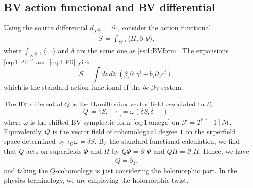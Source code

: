 \documentclass[final,reqno]{amsart}
\numberwithin{equation}{section}
\theoremstyle{definition}
\newcommand{\ol}{\overline}
\newcommand{\ceq}{\coloneqq} %
\newcommand{\clF}{\mathcal{F}}
\newcommand{\clM}{\mathcal{M}}
\newcommand{\pd}{\partial}
\newcommand{\sSig}{\Sigma^{1|1}}
\newcommand{\pair}[1]{\langle #1 \rangle}
\begin{document}
\subsection{BV action functional and BV differential}\label{ss:2.5}

Using the source differential $d_{\sSig}=\pd_{\ol{z}}$, 
consider the action functional
\begin{align}\label{eq:2:S}
 S \ceq \int_{\sSig} \pair{ \Pi, \pd_{\ol{z}} \Phi },
\end{align}
where $\int_{\sSig} $, $\pair{\cdot,\cdot}$ and $\delta$ 
are the same one as \cref{ss:1:BVform}.
The expansions \eqref{eq:1:Phii} and \eqref{eq:1:Pii} yield
\[
 S = \int dz\,d\ol{z}\;(\beta_i \pd_{\ol{z}}\gamma^i + b_i \pd_{\ol{z}}c^i),
\]
which is the standard action functional of the $bc$-$\beta\gamma$ system.

The BV differential $Q$ is the Hamiltonian vector field associated to $S$, 
\[
 Q \ceq \{S,-\}_\omega = \omega(\delta S,\delta-),
\]
where $\omega$ is the shifted BV symplectic form \eqref{eq:1:omega} 
on $\clF=T^*[-1]\clM$. 
Equivalently, $Q$ is the vector field of cohomological degree $1$ 
on the superfield space determined by 
$\iota_Q \omega = \delta S$.
By the standard functional calculation, we find that 
$Q$ acts on superfields $\Phi$ and $\Pi$ by
$Q\Phi = \pd_{\ol{z}}\Phi$ and $Q\Pi = \pd_{\ol{z}}\Pi$.
%
%
%
Hence, we have 
\begin{align}\label{eq:2:Q=pdoz}
 Q = \pd_{\ol{z}},
\end{align}
and taking the $Q$-cohomology is just considering the holomorphic part.
In the physics terminology, we are employing the holomorphic twist.


\end{document}
